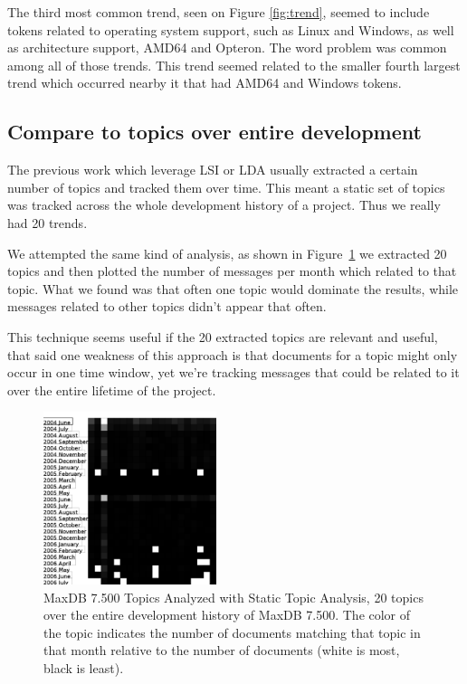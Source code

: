 \documentclass[times, 10pt,twocolumn]{article}
\begin{document}
The third most common trend, seen on Figure \ref{fig:trend}, seemed to
include tokens related to operating system support, such as Linux and
Windows, as well as architecture support, AMD64 and Opteron. The word
problem was common among all of those trends. This trend seemed
related to the smaller fourth largest trend which occurred nearby it
that had AMD64 and Windows tokens.

\subsection{Compare to topics over entire development}

The previous work which leverage LSI or LDA usually extracted a
certain number of topics and tracked them over time. This meant a
static set of topics was tracked across the whole development history
of a project. Thus we really had 20 trends. 

We attempted the same kind of analysis, as shown in
Figure~\ref{fig:statictopics} we extracted 20 topics and then plotted
the number of messages per month which related to that topic. What we
found was that often one topic would dominate the results, while
messages related to other topics didn't appear that often.

This technique seems useful if the 20 extracted topics are relevant
and useful, that said one weakness of this approach is that documents
for a topic might only occur in one time window, yet we're tracking
messages that could be related to it over the entire lifetime of the
project.

\begin{figure}
  \centering
  \includegraphics[width=0.45\textwidth]{maxdb7500-everything-by-month}
  \caption{MaxDB 7.500 Topics Analyzed with Static Topic Analysis, 20
    topics over the entire development history of MaxDB 7.500. The
    color of the topic indicates the number of documents matching that
    topic in that month relative to the number of documents (white is
    most, black is least).}
  \label{fig:statictopics}
\end{figure}
\end{document}

